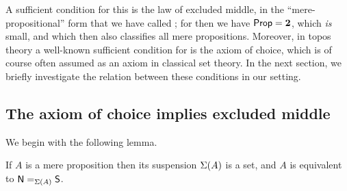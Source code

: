 A sufficient condition for this is the law of excluded middle, in the ``mere-propositional'' form that we have called \LEM{}; for then we have $\prop = \bool$, which \emph{is} small, and which then also classifies all mere propositions.
Moreover, in topos theory a well-known sufficient condition for \LEM{} is the axiom of choice, which is of course often assumed as an axiom in classical set theory.
In the next section, we briefly investigate the relation between these conditions in our setting.

%

\subsection{The axiom of choice implies excluded middle}
\label{subsec:emacinsets}


We begin with the following lemma.

\begin{lem}\label{prop:trunc_of_prop_is_set}
If $A$ is a mere proposition then its suspension $\susp(A)$ is a set,
and $A$ is equivalent to $\id[\susp(A)]{\north}{\south}$.
\end{lem}

